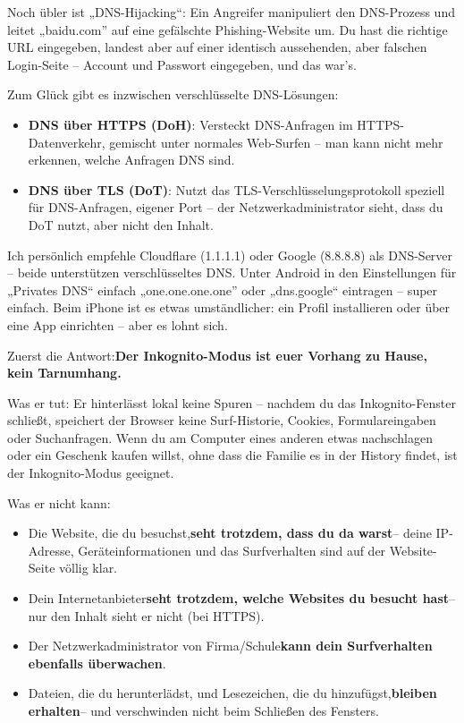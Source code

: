 Noch übler ist „DNS-Hijacking“: Ein Angreifer manipuliert den DNS-Prozess und leitet „baidu.com” auf eine gefälschte Phishing-Website um. Du hast die richtige URL eingegeben, landest aber auf einer identisch aussehenden, aber falschen Login-Seite – Account und Passwort eingegeben, und das war's.

Zum Glück gibt es inzwischen verschlüsselte DNS-Lösungen:

\begin{itemize}
  \item \textbf{DNS über HTTPS (DoH)}: Versteckt DNS-Anfragen im HTTPS-Datenverkehr, gemischt unter normales Web-Surfen – man kann nicht mehr erkennen, welche Anfragen DNS sind.
  \item \textbf{DNS über TLS (DoT)}: Nutzt das TLS-Verschlüsselungsprotokoll speziell für DNS-Anfragen, eigener Port – der Netzwerkadministrator sieht, dass du DoT nutzt, aber nicht den Inhalt.
\end{itemize}

Ich persönlich empfehle Cloudflare (1.1.1.1) oder Google (8.8.8.8) als DNS-Server – beide unterstützen verschlüsseltes DNS. Unter Android in den Einstellungen für „Privates DNS“ einfach „one.one.one.one” oder „dns.google“ eintragen – super einfach. Beim iPhone ist es etwas umständlicher: ein Profil installieren oder über eine App einrichten – aber es lohnt sich.


Zuerst die Antwort:\textbf{Der Inkognito-Modus ist euer Vorhang zu Hause, kein Tarnumhang.}

Was er tut: Er hinterlässt lokal keine Spuren – nachdem du das Inkognito-Fenster schließt, speichert der Browser keine Surf-Historie, Cookies, Formulareingaben oder Suchanfragen. Wenn du am Computer eines anderen etwas nachschlagen oder ein Geschenk kaufen willst, ohne dass die Familie es in der History findet, ist der Inkognito-Modus geeignet.

Was er nicht kann:

\begin{itemize}
  \item Die Website, die du besuchst,\textbf{seht trotzdem, dass du da warst}– deine IP-Adresse, Geräteinformationen und das Surfverhalten sind auf der Website-Seite völlig klar.
  \item Dein Internetanbieter\textbf{seht trotzdem, welche Websites du besucht hast}– nur den Inhalt sieht er nicht (bei HTTPS).
  \item Der Netzwerkadministrator von Firma/Schule\textbf{kann dein Surfverhalten ebenfalls überwachen}.
  \item Dateien, die du herunterlädst, und Lesezeichen, die du hinzufügst,\textbf{bleiben erhalten}– und verschwinden nicht beim Schließen des Fensters.
\end{itemize}

